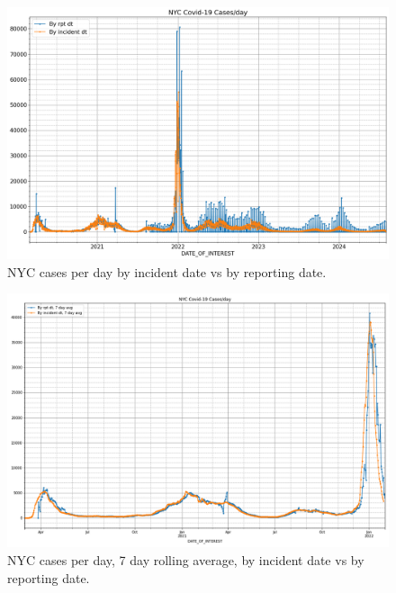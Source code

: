\documentclass[10pt,reqno]{amsart}
\begin{document}
\begin{figure}[H]
  \centering
  \includegraphics[width=\textwidth]{../Notebooks/casesPerDayHistoryRptDtVsInDtRaw.png}
  \caption{NYC cases per day by incident date vs by reporting date.}
  \label{fig:rptvsdataraw}
\end{figure}

\begin{figure}[H]
  \centering
  \includegraphics[width=\textwidth]{../Notebooks/casesPerDayHistoryRptDtVsInDt.png}
  \caption{NYC cases per day, 7 day rolling average, by incident date vs by reporting date.}
  \label{fig:rptvsdata7day}
\end{figure}


\printbibliography
\end{document}
